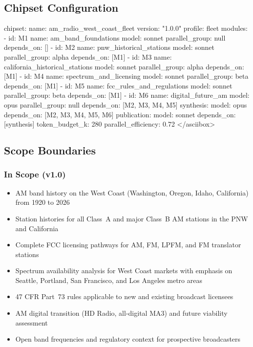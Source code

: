 \documentclass[11pt,letterpaper]{article}
\begin{document}
\subsection{Chipset Configuration}

\begin{asciibox}
chipset:
  name: am_radio_west_coast_fleet
  version: "1.0.0"
  profile: fleet
  modules:
    - id: M1
      name: am_band_foundations
      model: sonnet
      parallel_group: null
      depends_on: []
    - id: M2
      name: pnw_historical_stations
      model: sonnet
      parallel_group: alpha
      depends_on: [M1]
    - id: M3
      name: california_historical_stations
      model: sonnet
      parallel_group: alpha
      depends_on: [M1]
    - id: M4
      name: spectrum_and_licensing
      model: sonnet
      parallel_group: beta
      depends_on: [M1]
    - id: M5
      name: fcc_rules_and_regulations
      model: sonnet
      parallel_group: beta
      depends_on: [M1]
    - id: M6
      name: digital_future_am
      model: opus
      parallel_group: null
      depends_on: [M2, M3, M4, M5]
  synthesis:
    model: opus
    depends_on: [M2, M3, M4, M5, M6]
  publication:
    model: sonnet
    depends_on: [synthesis]
  token_budget_k: 280
  parallel_efficiency: 0.72
</asciibox>

\subsection{Scope Boundaries}

\subsubsection{In Scope (v1.0)}
\begin{itemize}[leftmargin=*]
  \item AM band history on the West Coast (Washington, Oregon, Idaho, California) from 1920 to 2026
  \item Station histories for all Class~A and major Class~B AM stations in the PNW and California
  \item Complete FCC licensing pathways for AM, FM, LPFM, and FM translator stations
  \item Spectrum availability analysis for West Coast markets with emphasis on Seattle, Portland, San Francisco, and Los Angeles metro areas
  \item 47 CFR Part~73 rules applicable to new and existing broadcast licensees
  \item AM digital transition (HD Radio, all-digital MA3) and future viability assessment
  \item Open band frequencies and regulatory context for prospective broadcasters
\end{itemize}


\end{asciibox}
\end{document}
